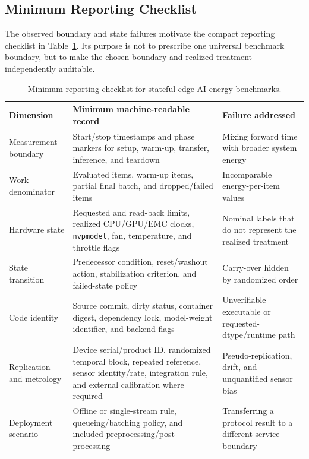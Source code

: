 \documentclass[electronics,article,submit,pdftex,moreauthors]{Definitions/mdpi}
\renewcommand{\tabref}[1]{Table~\ref{#1}}
\begin{document}
\subsection{Minimum Reporting Checklist}

The observed boundary and state failures motivate the compact reporting checklist in \tabref{tab:reporting-checklist}. Its purpose is not to prescribe one universal benchmark boundary, but to make the chosen boundary and realized treatment independently auditable.

\begin{table}[t]
\caption{Minimum reporting checklist for stateful edge-AI energy benchmarks.\label{tab:reporting-checklist}}
\begin{tabularx}{\textwidth}{>{\raggedright\arraybackslash}p{}>{\raggedright\arraybackslash}X>{\raggedright\arraybackslash}X}
\toprule
\textbf{Dimension} & \textbf{Minimum machine-readable record} & \textbf{Failure addressed} \\
\midrule
Measurement boundary & Start/stop timestamps and phase markers for setup, warm-up, transfer, inference, and teardown & Mixing forward time with broader system energy \\
Work denominator & Evaluated items, warm-up items, partial final batch, and dropped/failed items & Incomparable energy-per-item values \\
Hardware state & Requested and read-back limits, realized CPU/GPU/EMC clocks, \texttt{nvpmodel}, fan, temperature, and throttle flags & Nominal labels that do not represent the realized treatment \\
State transition & Predecessor condition, reset/washout action, stabilization criterion, and failed-state policy & Carry-over hidden by randomized order \\
Code identity & Source commit, dirty status, container digest, dependency lock, model-weight identifier, and backend flags & Unverifiable executable or requested-dtype/runtime path \\
Replication and metrology & Device serial/product ID, randomized temporal block, repeated reference, sensor identity/rate, integration rule, and external calibration where required & Pseudo-replication, drift, and unquantified sensor bias \\
Deployment scenario & Offline or single-stream rule, queueing/batching policy, and included preprocessing/post-processing & Transferring a protocol result to a different service boundary \\
\bottomrule
\end{tabularx}
\end{table}
\end{document}
